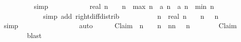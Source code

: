 \begin{isabellebody}
\ \ \ \ \ \ \ \ \isamarkupfalse%
\ simp\isanewline
\ \ \ \ \ \ \isamarkupfalse%
\ \isamarkupfalse%
\ {\isachardoublequoteopen}{\isachardot}{\isachardot}{\isachardot}\ {\isasymle}\ {\isacharparenleft}real\ n\ {\isacharminus}\ {}{\isacharparenright}\ {\isacharslash}\ n\ {\isacharasterisk}\ {\isacharparenleft}{\isacharparenleft}{\isacharquery}max\ {\isacharparenleft}n{\isacharminus}{}{\isacharparenright}\ {\isacharminus}\ a\ {\isacharparenleft}n{\isacharminus}{}{\isacharparenright}{\isacharparenright}\ {\isacharplus}\ {\isacharparenleft}a\ {\isacharparenleft}n{\isacharminus}{}{\isacharparenright}\ {\isacharminus}\ {\isacharquery}min\ {\isacharparenleft}n{\isacharminus}{}{\isacharparenright}{\isacharparenright}{\isacharparenright}{\isachardoublequoteclose}\isanewline
\ \ \ \ \ \ \ \ \isamarkupfalse%
\ {}\ {}\isanewline
\ \ \ \ \ \ \ \ \isamarkupfalse%
\ {\isacharparenleft}simp\ add{\isacharcolon}\ right{\isacharunderscore}diff{\isacharunderscore}distrib{\isacharprime}{\isacharparenright}\isanewline
\ \ \ \ \ \ \isamarkupfalse%
\ \isamarkupfalse%
\ {\isachardoublequoteopen}{\isacharquery}{\isasymDelta}\ n\ {\isasymle}\ {\isacharparenleft}real\ n\ {\isacharminus}\ {}{\isacharparenright}\ {\isacharslash}\ n\ {\isacharasterisk}\ {\isacharquery}{\isasymDelta}\ {\isacharparenleft}n{\isacharminus}{}{\isacharparenright}{\isachardoublequoteclose}\isanewline
\ \ \ \ \ \ \ \ \isamarkupfalse%
\ simp\isanewline
\ \ \ \ \isamarkupfalse%
\isanewline
\isanewline
\ \ \ \ \isamarkupfalse%
\ {\isasymDelta}\ \ {\isachardoublequoteopen}{\isasymDelta}\ {\isacharequal}\ {\isacharquery}{\isasymDelta}{\isachardoublequoteclose}\ \isamarkupfalse%
\ auto\isanewline
\ \ \ \ \isamarkupfalse%
\ Claim{}{\isacharprime}{\isacharcolon}\ {\isachardoublequoteopen}{\isasymforall}\ n\ {\isachargreater}\ {}{\isachardot}\ {\isasymDelta}\ n\ {\isasymle}\ {\isacharparenleft}n{\isacharminus}{}{\isacharparenright}{\isacharslash}n\ {\isacharasterisk}\ {\isasymDelta}\ {\isacharparenleft}n{\isacharminus}{}{\isacharparenright}{\isachardoublequoteclose}\isanewline
\ \ \ \ \ \ \isamarkupfalse%
\ Claim{}\isanewline
\ \ \ \ \ \ \isamarkupfalse%
\ blast\isanewline
\ \ \ \ \isanewline
\ \ \ \ \isamarkupfalse%

\end{isabellebody}

